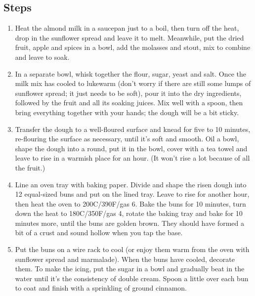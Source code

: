 \documentclass{book}
\begin{document}
\subsection*{Steps}
\begin{enumerate}
\item Heat the almond milk in a saucepan just to a boil, then turn off the heat, drop in the sunflower spread and leave it to melt. Meanwhile, put the dried fruit, apple and spices in a bowl, add the molasses and stout, mix to combine and leave to soak.
\item In a separate bowl, whisk together the flour, sugar, yeast and salt. Once the milk mix has cooled to lukewarm (don’t worry if there are still some lumps of sunflower spread; it just needs to be soft), pour it into the dry ingredients, followed by the fruit and all its soaking juices. Mix well with a spoon, then bring everything together with your hands; the dough will be a bit sticky.
\item Transfer the dough to a well-floured surface and knead for five to 10 minutes, re-flouring the surface as necessary, until it’s soft and smooth. Oil a bowl, shape the dough into a round, put it in the bowl, cover with a tea towel and leave to rise in a warmish place for an hour. (It won’t rise a lot because of all the fruit.) 
\item Line an oven tray with baking paper. Divide and shape the risen dough into 12 equal-sized buns and put on the lined tray. Leave to rise for another hour, then heat the oven to 200C/390F/gas 6. Bake the buns for 10 minutes, turn down the heat to 180C/350F/gas 4, rotate the baking tray and bake for 10 minutes more, until the buns are golden brown. They should have formed a bit of a crust and sound hollow when you tap the base.
\item Put the buns on a wire rack to cool (or enjoy them warm from the oven with sunflower spread and marmalade). When the buns have cooled, decorate them. To make the icing, put the sugar in a bowl and gradually beat in the water until it’s the consistency of double cream. Spoon a little over each bun to coat and finish with a sprinkling of ground cinnamon.
\end{enumerate}
\newpage
\end{document}

